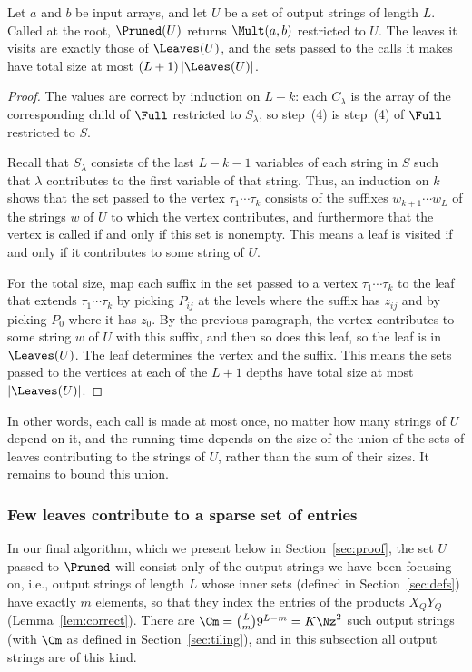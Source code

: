 \begin{lemma}\label{lem:prune}
Let $a$ and $b$ be input arrays, and let $U$ be a set of output strings of length $L$. Called at the root, $\Pruned(U)$ returns $\Mult(a,b)$ restricted to $U$. The leaves it visits are exactly those of $\Leaves(U)$, and the sets passed to the calls it makes have total size at most $(L+1)\,|\Leaves(U)|$.
\end{lemma}

\begin{proof}
The values are correct by induction on $L-k$: each $C_\lambda$ is the array of the corresponding child of $\Full$ restricted to $S_\lambda$, so step~(4) is step~(4) of $\Full$ restricted to $S$.

Recall that $S_\lambda$ consists of the last $L-k-1$ variables of each string in $S$ such that $\lambda$ contributes to the first variable of that string. Thus, an induction on $k$ shows that the set passed to the vertex $\tau_1\cdots\tau_k$ consists of the suffixes $w_{k+1}\cdots w_L$ of the strings $w$ of $U$ to which the vertex contributes, and furthermore that the vertex is called if and only if this set is nonempty. This means a leaf is visited if and only if it contributes to some string of $U$.

For the total size, map each suffix in the set passed to a vertex $\tau_1\cdots\tau_k$ to the leaf that extends $\tau_1\cdots\tau_k$ by picking $P_{ij}$ at the levels where the suffix has $z_{ij}$ and by picking $P_0$ where it has $z_0$. By the previous paragraph, the vertex contributes to some string $w$ of $U$ with this suffix, and then so does this leaf, so the leaf is in $\Leaves(U)$. The leaf determines the vertex and the suffix. This means the sets passed to the vertices at each of the $L+1$ depths have total size at most $|\Leaves(U)|$.
\end{proof}

In other words, each call is made at most once, no matter how many strings of $U$ depend on it, and the running time depends on the size of the union of the sets of leaves contributing to the strings of $U$, rather than the sum of their sizes. It remains to bound this union.

\subsubsection{Few leaves contribute to a sparse set of entries}\label{sec:counts}

In our final algorithm, which we present below in Section~\ref{sec:proof}, the set $U$ passed to $\Pruned$ will consist only of the output strings we have been focusing on, i.e., output strings of length $L$ whose inner sets (defined in Section~\ref{sec:defs}) have exactly $m$ elements, so that they index the entries of the products $X_QY_Q$ (Lemma~\ref{lem:correct}). There are $\Cm=\binom Lm9^{L-m}=K\Nz^2$ such output strings (with $\Cm$ as defined in Section~\ref{sec:tiling}), and in this subsection all output strings are of this kind.

